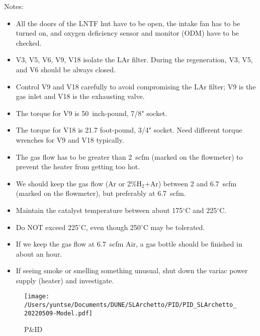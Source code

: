 \documentclass[letterpaper,11pt]{article}
\newcommand{\Hydro}     {H$_2$}
\newcommand{\dC}        {$^\circ$C}
\begin{document}
Notes:
\begin{itemize}
\setlength\itemsep{-0.2em}
\item All the doors of the LNTF hut have to be open, the intake fan has to be turned on, and oxygen deficiency sensor and monitor (ODM) have to be checked.
\item V3, V5, V6, V9, V18 isolate the LAr filter.  During the regeneration, V3, V5, and V6 should be always closed.
\item Control V9 and V18 carefully to avoid compromising the LAr filter; V9 is the gas inlet and V18 is the exhausting valve.
\item The torque for V9 is 50~inch-pound, 7/8" socket.
\item The torque for V18 is 21.7 foot-pound, 3/4" socket.  Need different torque wrenches for V9 and V18 typically.
\item The gas flow has to be greater than 2~scfm (marked on the flowmeter) to prevent the heater from getting too hot.
\item We should keep the gas flow (Ar or 2\%{\Hydro}+Ar) between 2 and 6.7~scfm (marked on the flowmeter), but preferably at 6.7~scfm.
\item Maintain the catalyst temperature between about 175{\dC} and
225{\dC}.
\item Do NOT exceed 225{\dC}, even though 250{\dC} may be tolerated.
\item If we keep the gas flow at 6.7~scfm Air, a gas bottle should be finished in about an hour.
\item If seeing smoke or smelling something unusual, shut down the variac power supply (heater) and investigate.
\end{itemize}

\clearpage
\begin{figure}[htb]
\begin{center}
\texttt{[image: /Users/yuntse/Documents/DUNE/SLArchetto/PID/PID\_SLArchetto\_20220509-Model.pdf]}
\caption{P\&ID}
\end{center}
\end{figure}
\end{document}
